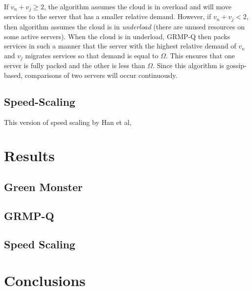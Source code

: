 \documentclass{sig-alternate}
\begin{document}
If $v_n + v_j \geq 2$, the algorithm assumes the cloud is in overload and will move services to the server that has a smaller relative demand. However, if $v_n + v_j < 2$, then algorithm assumes the cloud is in \emph{underload} (there are unused resources on some active servers). When the cloud is in underload, GRMP-Q then packs services in such a manner that the server with the highest relative demand of $v_n$ and $v_j$ migrates services so that demand is equal to $\Omega$. This ensures that one server is fully packed and the other is less than $\Omega$. Since this algorithm is gossip-based,  comparisons of two servers will occur continuously.~\citep{Yanggratoke}  



\subsection{Speed-Scaling}
\label{sec:Speed}
This version of speed scaling by Han et al, 
\section{Results} 
\label{sec:results}
\subsection{Green Monster}
\label{sec:GM}
\subsection{GRMP-Q}
\label{sec:GRMP-Q}
\subsection{Speed Scaling}
\label{sec:SS}

\section{Conclusions} 
\label{sec:conclusion}





\pagebreak



\end{document}

